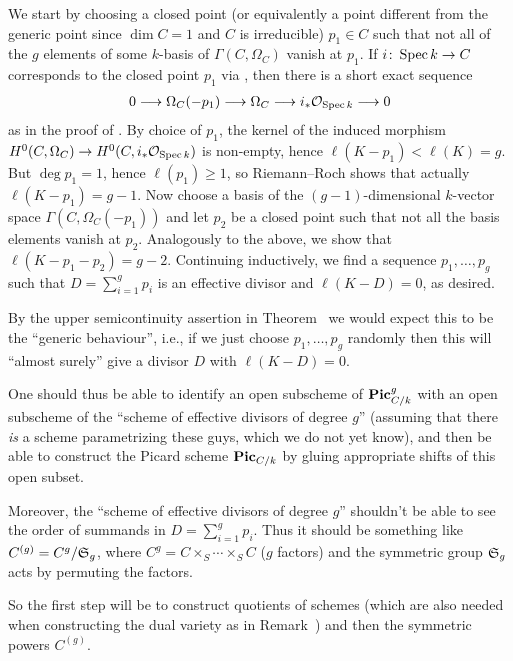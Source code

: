 \documentclass[a4paper,parskip=half,numbers=enddot, DIV=12]{scrreprt}
\renewcommand{\geq}{\geqslant}
\begin{document}
We start by choosing a closed point (or equivalently a point different from the generic point since $\dim C=1$ and $C$ is irreducible) $p_1\in C$ such that not all of the $g$ elements of some $k$-basis of $\Gamma(C,\Omega_C)$ vanish at $p_1$. If $i\colon \Spec k\morphism C$ corresponds to the closed point $p_1$ via , then there is a short exact sequence
\begin{align*}
	0\morphism \Omega_C(-p_1)\morphism\Omega_C\morphism i_*\Oo_{\Spec k}\morphism 0
\end{align*}
as in the proof of \cite[Lemma~3.2.2]{alggeo2}. By choice of $p_1$, the kernel of the induced morphism $H^0(C,\Omega_C)\morphism H^0(C,i_*\Oo_{\Spec k})$ is non-empty, hence $\ell(K-p_1)<\ell(K)=g$. But $\deg p_1=1$, hence $\ell(p_1)\geq 1$, so Riemann--Roch shows that actually $\ell(K-p_1)=g-1$. Now choose a basis of the $(g-1)$-dimensional $k$-vector space $\Gamma(C,\Omega_C(-p_1))$ and let $p_2$ be a closed point such that not all the basis elements vanish at $p_2$. Analogously to the above, we show that $\ell(K-p_1-p_2)=g-2$. Continuing inductively, we find a sequence $p_1,\ldots,p_g$ such that $D=\sum_{i=1}^gp_i$ is an effective divisor and $\ell(K-D)=0$, as desired.

By the upper semicontinuity assertion in Theorem~ we would expect this to be the ``generic behaviour'', i.e., if we just choose $p_1,\ldots,p_g$ randomly then this will ``almost surely'' give a divisor $D$ with $\ell(K-D)=0$.

One should thus be able to identify an open subscheme of $\mathbf{Pic}_{C/k}^g$ with an open subscheme of the ``scheme of effective divisors of degree $g$'' (assuming that there \emph{is} a scheme parametrizing these guys, which we do not yet know), and then be able to construct the Picard scheme $\mathbf{Pic}_{C/k}$ by gluing appropriate shifts of this open subset.

Moreover, the ``scheme of effective divisors of degree $g$'' shouldn't be able to see the order of summands in $D=\sum_{i=1}^gp_i$. Thus it should be something like $C^{(g)}=C^g/\mathfrak{S}_g$, where $C^g=C\times_S\cdots\times_SC$ ($g$ factors) and the symmetric group $\mathfrak{S}_g$ acts by permuting the factors. 

So the first step will be to construct quotients of schemes (which are also needed when constructing the dual variety as in Remark~) and then the symmetric powers $C^{(g)}$.
\end{document}
